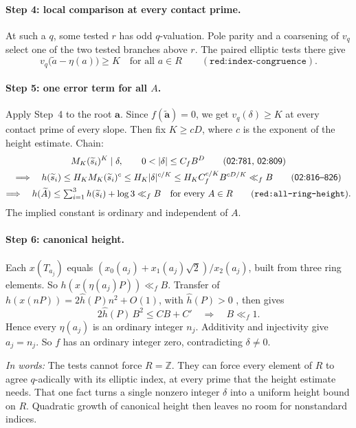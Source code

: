 \documentclass[11pt]{article}
\theoremstyle{definition}
\newcommand{\Z}{\mathbb Z}
\newcommand{\lbl}[1]{\texttt{#1}}
\newcommand{\src}[1]{\textsf{#1}}
\newcommand{\inwords}[1]{\par\smallskip\noindent\emph{In words:} #1\par}
\begin{document}
\paragraph{Step 4: local comparison at every contact prime.}
At such a $q$, some tested $r$ has odd $q$-valuation.  Pole parity and a
coarsening of $v_q$ select one of the two tested branches above $r$.  The
paired elliptic tests there give
\[
 v_q\bigl(\widetilde a-\eta(a)\bigr)\ge K\quad\text{for all }a\in R
 \qquad(\lbl{red:index-congruence}).
\]

\paragraph{Step 5: one error term for all $A$.}
Apply Step~4 to the root $\mathbf a$.  Since $f(\widetilde{\mathbf a})=0$,
we get $v_q(\delta)\ge K$ at every contact prime of every slope.  Then fix
$K\ge cD$, where $c$ is the exponent of the height estimate.  Chain:
\begin{gather*}
 M_K(\widetilde s_i)^K\mid\delta,\qquad
 0<|\delta|\le C_fB^D
 \qquad(\text{\src{02:781}, \src{02:809}})\\
 \Longrightarrow\quad
 h(\widetilde s_i)\le H_KM_K(\widetilde s_i)^c
 \le H_K|\delta|^{c/K}
 \le H_KC_f^{c/K}B^{cD/K}\ll_f B
 \qquad(\text{\src{02:816--826}})\\
 \Longrightarrow\quad
 h(\widetilde A)\le\textstyle\sum_{i=1}^3h(\widetilde s_i)+\log3\ll_f B
 \quad\text{for every }A\in R
 \qquad(\lbl{red:all-ring-height}).
\end{gather*}
The implied constant is ordinary and independent of $A$.

\paragraph{Step 6: canonical height.}
Each $x(T_{a_j})$ equals $(x_0(a_j)+x_1(a_j)\sqrt2)/x_2(a_j)$, built from
three ring elements.  So
$h(x(\eta(a_j)P))\ll_f B$.  Transfer of
$h(x(nP))=2\widehat h(P)n^2+O(1)$, with $\widehat h(P)>0$ \cite{Silverman2009}, then gives
\[
 2\widehat h(P)\,B^2\le CB+C'
 \quad\Longrightarrow\quad B\ll_f 1.
\]
Hence every $\eta(a_j)$ is an ordinary integer $n_j$.  Additivity and
injectivity give $a_j=n_j$.  So $f$ has an ordinary integer zero,
contradicting $\delta\ne0$.

\inwords{The tests cannot force $R=\Z$.  They can force every element of
$R$ to agree $q$-adically with its elliptic index, at every prime that the
height estimate needs.  That one fact turns a single nonzero integer
$\delta$ into a uniform height bound on $R$.  Quadratic growth of
canonical height then leaves no room for nonstandard indices.}
\end{document}
